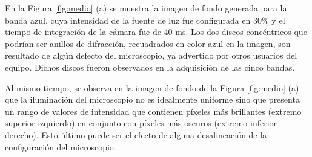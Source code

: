 En la Figura \ref{fig:medio} (a) se muestra la imagen de fondo generada para la banda azul, cuya intensidad de la fuente de luz fue configurada en 30$\%$ y el tiempo de integración de la cámara fue de 40 ms. Los dos discos concéntricos que podrían ser anillos de difracción, recuadrados en color azul en la imagen, son resultado de algún defecto del microscopio, ya advertido por otros usuarios del equipo. Dichos discos fueron observados en la adquisición de las cinco bandas.

Al mismo tiempo, se observa en la imagen de fondo de la Figura \ref{fig:medio} (a) que la iluminación del microscopio no es idealmente uniforme sino que presenta un rango de valores de intensidad que contienen píxeles más brillantes (extremo superior izquierdo) en conjunto con píxeles más oscuros (extremo inferior derecho). Esto último puede ser el efecto de alguna desalineación de la configuración del microscopio.
 
